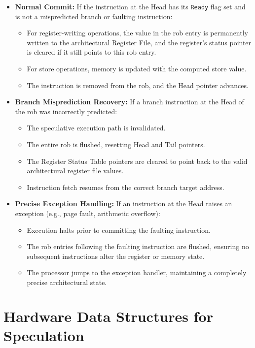 \begin{itemize}
    \item \textbf{Normal Commit:} If the instruction at the Head has its \texttt{Ready} flag set and is not a mispredicted branch or faulting instruction:
    \begin{itemize}
        \item For register-writing operations, the value in the \gls{rob} entry is permanently written to the architectural Register File, and the register's status pointer is cleared if it still points to this \gls{rob} entry.
        \item For store operations, memory is updated with the computed store value.
        \item The instruction is removed from the \gls{rob}, and the Head pointer advances.
    \end{itemize}
    \item \textbf{Branch Misprediction Recovery:} If a branch instruction at the Head of the \gls{rob} was incorrectly predicted:
    \begin{itemize}
        \item The speculative execution path is invalidated.
        \item The entire \gls{rob} is flushed, resetting Head and Tail pointers.
        \item The Register Status Table pointers are cleared to point back to the valid architectural register file values.
        \item Instruction fetch resumes from the correct branch target address.
    \end{itemize}
    \item \textbf{Precise Exception Handling:} If an instruction at the Head raises an exception (e.g., page fault, arithmetic overflow):
    \begin{itemize}
        \item Execution halts prior to committing the faulting instruction.
        \item The \gls{rob} entries following the faulting instruction are flushed, ensuring no subsequent instructions alter the register or memory state.
        \item The processor jumps to the exception handler, maintaining a completely precise architectural state.
    \end{itemize}
\end{itemize}

\section{Hardware Data Structures for Speculation}
\label{sec:speculation_data_structures}

